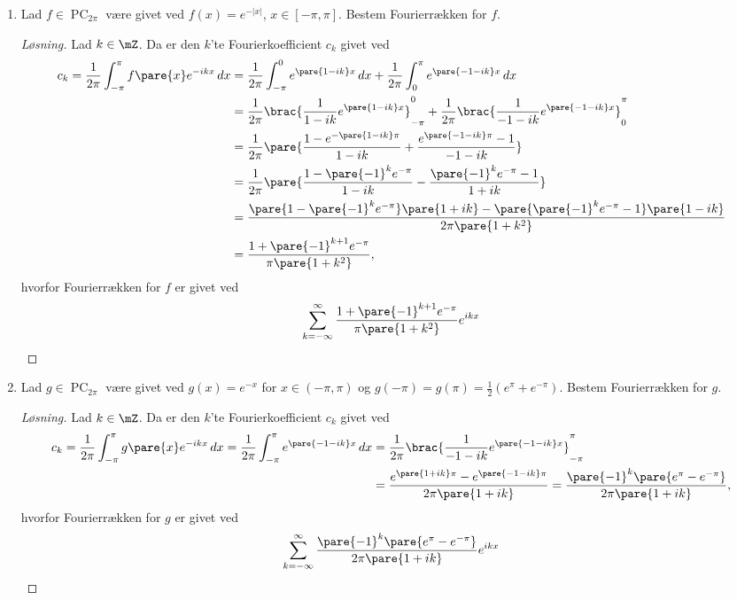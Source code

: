 \begin{opg} \hfill

\begin{enumerate}
\item Lad $f\in\operatorname{PC}_{2\pi}$ være givet ved
$f(x)=e^{-|x|}$, $x\in [-\pi,\pi]$. Bestem Fourierrækken for $f$.

\begin{proof}[Løsning]
Lad $k\in\mZ$. Da er den $k$'te Fourierkoefficient $c_k$ givet ved
\begin{align*}
    c_k = \frac{1}{2\pi}\int_{-\pi}^\pi f\pare{x} e^{-ikx} \, dx
        &= \frac{1}{2\pi}\int_{-\pi}^0 e^{\pare{1-ik}x} \, dx
            + \frac{1}{2\pi}\int_0^\pi e^{\pare{-1-ik}x} \, dx \\
        &= \frac{1}{2\pi}\brac{\frac{1}{1-ik}e^{\pare{1-ik}x}}_{-\pi}^0
        + \frac{1}{2\pi}\brac{\frac{1}{-1-ik}e^{\pare{-1-ik}x}}_0^\pi \\
        &= \frac{1}{2\pi}\pare{\frac{1-e^{-\pare{1-ik}\pi}}{1-ik}
            + \frac{e^{\pare{-1-ik}\pi} - 1}{-1-ik}} \\
        &= \frac{1}{2\pi}\pare{\frac{1-\pare{-1}^ke^{-\pi}}{1-ik}
            - \frac{\pare{-1}^ke^{-\pi} - 1}{1+ik}} \\
        &= \frac{\pare{1-\pare{-1}^ke^{-\pi}}\pare{1+ik} - \pare{\pare{-1}^ke^{-\pi}-1}\pare{1-ik}}{2\pi\pare{1+k^2}} \\
        &= \frac{1 + \pare{-1}^{k+1}e^{-\pi}}{\pi\pare{1+k^2}},
\end{align*}
hvorfor Fourierrækken for $f$ er givet ved 
$$ \sum_{k=-\infty}^\infty
    \frac{1 + \pare{-1}^{k+1}e^{-\pi}}{\pi\pare{1+k^2}} e^{ikx} $$
\end{proof}

\item Lad $g\in\operatorname{PC}_{2\pi}$ være givet ved 
$g(x)=e^{-x}$ for $x\in(-\pi,\pi)$ og $g(-\pi)=g(\pi)=\frac12(e^\pi+e^{-\pi})$. Bestem Fourierrækken for $g$.

\begin{proof}[Løsning]
Lad $k\in\mZ$. Da er den $k$'te Fourierkoefficient $c_k$ givet ved
\begin{align*}
    c_k = \frac{1}{2\pi}\int_{-\pi}^\pi g\pare{x} e^{-ikx} \, dx
        = \frac{1}{2\pi}\int_{-\pi}^\pi e^{\pare{-1-ik}x} \, dx
        &= \frac{1}{2\pi}\brac{\frac{1}{-1-ik}e^{\pare{-1-ik}x}}_{-\pi}^\pi \\
        &= \frac{e^{\pare{1+ik}\pi} - e^{\pare{-1-ik}\pi}}{2\pi\pare{1+ik}}
        = \frac{\pare{-1}^k\pare{e^\pi - e^{-\pi}}}{2\pi\pare{1+ik}},
\end{align*}
hvorfor Fourierrækken for $g$ er givet ved
$$ \sum_{k=-\infty}^\infty
    \frac{\pare{-1}^k\pare{e^\pi - e^{-\pi}}}{2\pi\pare{1+ik}} e^{ikx} $$
\end{proof}


\end{enumerate}
\end{opg}
